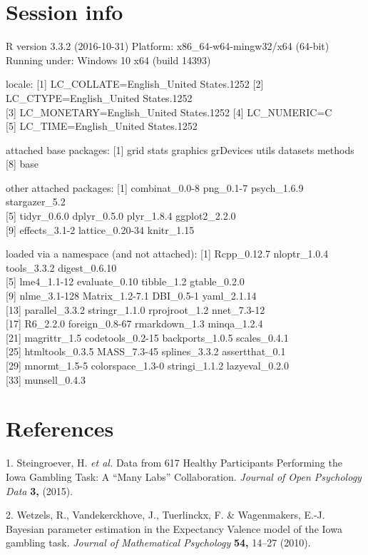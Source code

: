 \documentclass[,]{article}
\begin{document}
\newpage

\section{Session info}\label{session-info}

R version 3.3.2 (2016-10-31) Platform: x86\_64-w64-mingw32/x64 (64-bit)
Running under: Windows 10 x64 (build 14393)

locale: {[}1{]} LC\_COLLATE=English\_United States.1252 {[}2{]}
LC\_CTYPE=English\_United States.1252\\
{[}3{]} LC\_MONETARY=English\_United States.1252 {[}4{]} LC\_NUMERIC=C\\
{[}5{]} LC\_TIME=English\_United States.1252

attached base packages: {[}1{]} grid stats graphics grDevices utils
datasets methods\\
{[}8{]} base

other attached packages: {[}1{]} combinat\_0.0-8 png\_0.1-7 psych\_1.6.9
stargazer\_5.2\\
{[}5{]} tidyr\_0.6.0 dplyr\_0.5.0 plyr\_1.8.4 ggplot2\_2.2.0\\
{[}9{]} effects\_3.1-2 lattice\_0.20-34 knitr\_1.15

loaded via a namespace (and not attached): {[}1{]} Rcpp\_0.12.7
nloptr\_1.0.4 tools\_3.3.2 digest\_0.6.10\\
{[}5{]} lme4\_1.1-12 evaluate\_0.10 tibble\_1.2 gtable\_0.2.0\\
{[}9{]} nlme\_3.1-128 Matrix\_1.2-7.1 DBI\_0.5-1 yaml\_2.1.14\\
{[}13{]} parallel\_3.3.2 stringr\_1.1.0 rprojroot\_1.2 nnet\_7.3-12\\
{[}17{]} R6\_2.2.0 foreign\_0.8-67 rmarkdown\_1.3 minqa\_1.2.4\\
{[}21{]} magrittr\_1.5 codetools\_0.2-15 backports\_1.0.5
scales\_0.4.1\\
{[}25{]} htmltools\_0.3.5 MASS\_7.3-45 splines\_3.3.2 assertthat\_0.1\\
{[}29{]} mnormt\_1.5-5 colorspace\_1.3-0 stringi\_1.1.2
lazyeval\_0.2.0\\
{[}33{]} munsell\_0.4.3

\section*{References}\label{references}

\hypertarget{refs}{}
\hypertarget{ref-steingroever_data_2015}{}
1. Steingroever, H. \emph{et al.} Data from 617 Healthy Participants
Performing the Iowa Gambling Task: A ``Many Labs'' Collaboration.
\emph{Journal of Open Psychology Data} \textbf{3,} (2015).

\hypertarget{ref-wetzels_bayesian_2010}{}
2. Wetzels, R., Vandekerckhove, J., Tuerlinckx, F. \& Wagenmakers, E.-J.
Bayesian parameter estimation in the Expectancy Valence model of the
Iowa gambling task. \emph{Journal of Mathematical Psychology}
\textbf{54,} 14--27 (2010).
\end{document}
